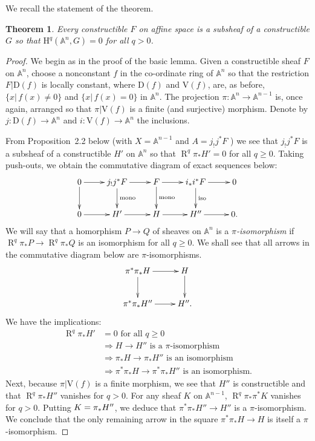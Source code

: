 \documentclass[10pt,twoside]{article}
\newtheorem{thm}{Theorem}[section]
\newcommand{\homology}{{\mathrm {H}}}
\newcommand{\V}{{\mathrm {V}}}
\newcommand{\A}{{\mathbb {A}}}
\newcommand{\derived}{{\operatorname{R}}}
\newtheorem{proof}{Proof}
\begin{document}
We recall the statement of the theorem.

\renewcommand{\thethm}{1}

\begin{thm} Every constructible  $F$ on affine space
is a subsheaf of a constructible $G$ so that
$\homology^q(\A^n,G)=0$ for all $q>0 $.
\end{thm}

\begin{proof} We begin as in the proof of the basic lemma.
Given a constructible sheaf $F$
on $\A^n$, choose a nonconstant $f$ in the co-ordinate
ring of $\A^n$ so that the restriction $F|\mathrm{D}(f)$ is
locally constant, where $\mathrm{D}(f)$ and $\V(f)$, are, as before,
$\{ x|\,f(x)\neq 0\}$ and $\{x|\,f(x)=0\}$ in $\A^n$. 
The projection $\pi:\A^n\to \A^{n-1}$ is, once again, arranged
so that $\pi|\V(f)$ is a finite (and surjective) morphism. 
Denote by 
$j:\mathrm{D}(f)\to \A^n$ and $i:\V(f)\to \A^n$ the inclusions.

From Proposition~2.2 below (with $X=\A^{n-1}$ and $A=j_!j^*F$ )
we see that $j_!j^*F$ is a subsheaf of 
a constructible $H'$
on $\A^n$ so that $\derived^q\pi_*H'=0$ for all $q\geq 0$.
Taking push-outs, we obtain the commutative diagram
of exact sequences below:
$$
\xymatrix{       
0 \ar[r]\ar[d] &  j_!j^*F \ar[r]\ar[d]^-{\text{mono}}  &     
F \ar[r]\ar[d]^-{\text{mono}}  & i_*i^*F \ar[r]\ar[d]^-{\text{iso}} & 0 \\
0 \ar[r] &  H'  \ar[r] & H    \ar[r]  &H''  \ar[r] & 0. \\
}   
$$
We will say that a homorphism $P\to Q$ of sheaves on $\A^n$
is a \emph{$\pi$-isomorphism} if  
$\derived^q\pi_*P \to \derived^q\pi_*Q$
is an isomorphism for all $q\geq 0$. We shall see that all arrows
in the commutative diagram below are $\pi$-isomorphisms.
$$
\xymatrix{
\pi^*\pi_*H \ar[r]\ar[d]  & H\ar[d] \\
\pi^*\pi_*H'' \ar[r] &  H''.     \\
}
$$
We have the implications:
\begin{equation*}
\begin{split}
\derived^q\pi_*H'& =0 \mbox{ for all } q\geq 0\\
&\Rightarrow H\to H'' \mbox{ is a } \pi\mbox{-isomorphism}\\
&\Rightarrow \pi_*H \to \pi_*H'' \mbox{ is an isomorphism}\\
&\Rightarrow \pi^*\pi_*H \to \pi^*\pi_*H'' \mbox{ is an isomorphism.}
\end{split}
\end{equation*}
Next, because $\pi |\mathrm{V}(f)$ is a finite morphism, we
see that $H''$ is constructible and that 
$\derived ^q \pi_*H''$ vanishes for $q>0$. For any sheaf $K$ 
on $\A ^{n-1}$, $\derived ^q \pi_*\pi^*K$ vanishes for $q>0$.
Putting $K=\nolinebreak \pi_*H''$, 
we deduce that $\pi^*\pi_*H'' \to H''$ is a $\pi$-isomorphism.
We conclude that the only remaining
arrow in the square $\pi^*\pi_*H \to H$ is 
itself a $\pi$-isomorphism. 


\end{proof}
\end{document}
